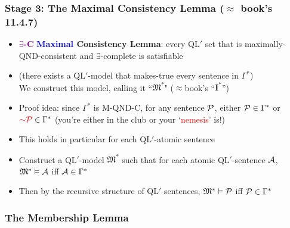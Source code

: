 \begin{frame}
\frametitle{Stage 3: The Maximal Consistency Lemma ($\approx$ book's 11.4.7)}

\begin{itemize}[<+->]

\item \textbf{\textcolor{purple}{$\exists$-C}} \textbf{\textcolor{blue}{Maximal} \alert{Consistency Lemma}}: every QL$'$ set that is maximally-QND-consistent and $\exists$-complete is satisfiable

\item (there exists a QL$'$-model that makes-true every sentence in $\Gamma^{\ast}$) \\ We construct this model, calling it ``$\mathfrak{M}^{\ast}$" ($\approx$book's ``$\textbf{I}^{\ast}$'')

\item Proof idea: since $\Gamma^{\ast}$ is M-QND-C, for any sentence $\mathcal{P}$, either $\mathcal{P} \in \Gamma^{\ast}$ or $\textcolor{red}{\enot \metav{P}} \in \Gamma^{\ast}$ (you're either in the club or your `\textcolor{red}{nemesis}' is!)

\item[] This holds in particular for each QL$'$-atomic sentence

\item Construct a QL$'$-model $\mathfrak{M}^{\ast}$ such that for each atomic QL$'$-sentence $\mathcal{A}$, $\mathfrak{M}^{\ast} \vDash \mathcal{A}$ iff $\mathcal{A} \in \Gamma^{\ast}$

\item Then by the recursive structure of QL$'$ sentences, $\mathfrak{M}^{\ast} \vDash \mathcal{P}$ iff $\mathcal{P} \in \Gamma^{\ast}$

\end{itemize}
\end{frame}

\subsubsection{The Membership Lemma}

